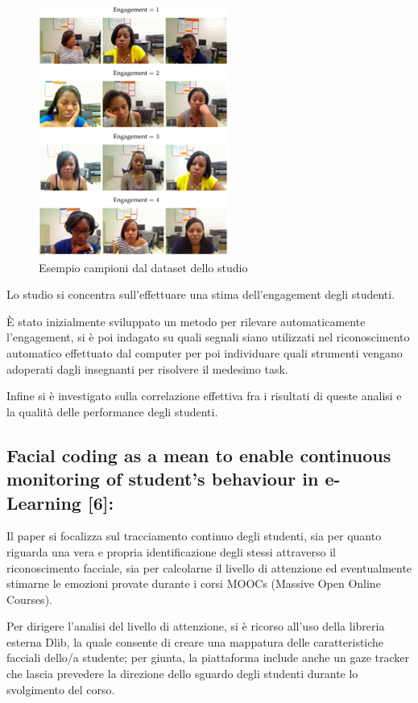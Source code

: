 \begin{figure}
    \begin{center}    
        \includegraphics[width=0.4\linewidth]{images/2.png}
        \caption{Esempio campioni dal dataset dello studio}
    \end{center}
\end{figure}


Lo studio si concentra sull’effettuare una stima dell’engagement degli studenti. 

È stato inizialmente sviluppato un metodo per rilevare automaticamente l’engagement, si è poi indagato su quali segnali siano utilizzati nel riconoscimento automatico effettuato dal computer per poi individuare quali strumenti vengano adoperati dagli insegnanti per risolvere il medesimo task.

Infine si è investigato sulla correlazione effettiva fra i risultati di queste analisi e la qualità delle performance degli studenti.

\subsection{Facial coding as a mean to enable continuous monitoring of student’s behaviour in e-Learning [6]:}

Il paper si focalizza sul tracciamento continuo degli studenti, sia per quanto riguarda una vera e propria identificazione degli stessi attraverso il riconoscimento facciale, sia per calcolarne il livello di attenzione ed eventualmente stimarne le emozioni provate durante i corsi MOOCs (Massive Open Online Courses).

Per dirigere l’analisi del livello di attenzione, si è ricorso all’uso della libreria esterna Dlib, la quale consente di creare una mappatura delle caratteristiche facciali dello/a studente; per giunta, la piattaforma include anche un gaze tracker che lascia prevedere la direzione dello sguardo degli studenti durante lo svolgimento del corso.

